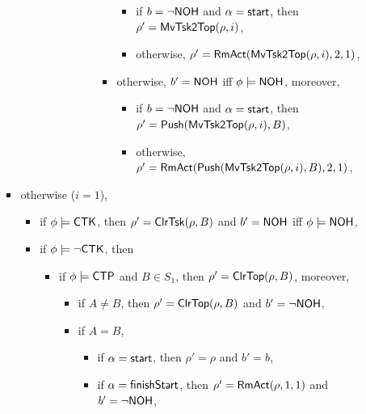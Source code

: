 \begin{itemize}
\begin{itemize}
\begin{itemize}
\begin{itemize}
\begin{itemize}
\begin{itemize}
\begin{itemize}
\begin{itemize}
									\begin{itemize}
										\item if $b = \neg {\sf NOH}$ and $\alpha = {\mathsf{start} }$, then $\rho'=\mathsf{MvTsk2Top}(\rho, i)$,
										\item otherwise, $\rho' = \mathsf{RmAct}(\mathsf{MvTsk2Top}(\rho, i), 2, 1)$, 
									\end{itemize}
									\item otherwise, $b' = {\sf NOH}$ iff $\phi \models {\sf NOH}$, moreover, 
									\begin{itemize}
										\item if $b = \neg {\sf NOH}$ and $\alpha = {\mathsf{start} }$, then $\rho'=\mathsf{Push}(\mathsf{MvTsk2Top}(\rho, i), B)$,
										\item otherwise, $\rho' = \mathsf{RmAct}(\mathsf{Push}(\mathsf{MvTsk2Top}(\rho, i), B), 2, 1)$, 
									\end{itemize}
								\end{itemize}
							\end{itemize}
						\end{itemize}
					\end{itemize}
			\end{itemize}
		\item otherwise ($i  = 1$),  
		\begin{itemize}
			\item if $\phi \models {\sf CTK}$, then $\rho' = \mathsf{ClrTsk}(\rho,B)$ and $b' = {\sf NOH}$ iff $\phi \models {\sf NOH}$, 
			\item if $\phi \models \neg {\sf CTK}$, then
			\begin{itemize}
				\item if $\phi \models {\sf CTP}$ and $B \in S_1$, then $\rho'=\mathsf{ClrTop}(\rho, B)$, moreover, 
				\begin{itemize}
					\item if $A \neq B$, then $\rho'=\mathsf{ClrTop}(\rho, B)$ and $b' = \neg {\sf NOH}$,
					\item if $A = B$, 
					\begin{itemize}
						\item if $\alpha = {\mathsf{start} }$, then $\rho' = \rho$ and $b' = b$,
						\item if $\alpha = {\mathsf{finishStart} }$, then $\rho' = \mathsf{RmAct}(\rho, 1, 1)$ and $b' = \neg{\sf NOH}$,

\end{itemize}
\end{itemize}
\end{itemize}
\end{itemize}
\end{itemize}
\end{itemize}
\end{itemize}
